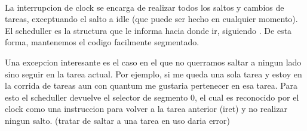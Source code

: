 \\
La interrupcion de clock se encarga de realizar todos los saltos y cambios de tareas, exceptuando el salto a idle (que puede ser hecho en cualquier momento). El scheduller
es la structura que le informa hacia donde ir, siguiendo . De esta forma, mantenemos el codigo facilmente segmentado.

Una excepcion interesante es el caso en el que no querramos saltar a ningun lado sino seguir en la tarea actual. Por ejemplo, si me queda una sola tarea y estoy en la corrida
de tareas aun con quantum me gustaria pertenecer en esa tarea. Para esto el scheduller devuelve el selector de segmento 0, el cual es reconocido por el clock como una
instruccion para volver a la tarea anterior (iret) y no realizar ningun salto. (tratar de saltar a una tarea en uso daria error)
